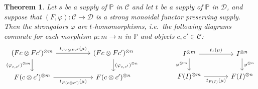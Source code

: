 \documentclass[11pt, oneside, article]{memoir}
\theoremstyle{plain}
\newtheorem{theorem}{Theorem}[chapter]
\theoremstyle{definition}
\theoremstyle{remark}
\newcommand{\cat}[1]{\mathcal{#1}}%
\newcommand{\tpow}[1]{^{\otimes #1}}
\newcommand{\pp}{\mathbb{P}}
\begin{document}
\begin{theorem}\label{thm.pres_supp_strongators_homo}
Let $s$ be a supply of $\pp$ in $\cat{C}$ and let $t$ be a supply of $\pp$ in $\cat{D}$, and suppose that $(F,\varphi)\colon\cat{C}\to\cat{D}$ is a strong monoidal functor preserving supply. Then the strongators $\varphi$ are $t$-homomorphisms, i.e.\ the following diagrams commute for each morphism $\mu\colon m\to n$ in $\pp$ and objects $c,c'\in\cat{C}$:
\[
\begin{tikzcd}[column sep=50pt]
	(Fc\otimes Fc')\tpow{m}
		\ar[r, "t_{Fc\otimes Fc'}(\mu)"]\ar[d, "(\varphi_{c,c'})\tpow{m}"']&
 	(Fc\otimes Fc')\tpow{n}\ar[d, "(\varphi_{c,c'})\tpow{n}"]\\
  F(c\otimes c')\tpow{m}\ar[r, "t_{F(c\otimes c')}(\mu)"']&
  F(c\otimes c')\tpow{n}
\end{tikzcd}
\hspace{.7in}
\begin{tikzcd}[column sep=35pt]
	I\tpow{m}
		\ar[r, "t_I(\mu)"]\ar[d, "\varphi\tpow{m}"']&
 	I\tpow{n}\ar[d, "\varphi\tpow{n}"]\\
  F(I)\tpow{m}\ar[r, "t_{F(I)}(\mu)"']&
  F(I)\tpow{n}
\end{tikzcd}
\]
\end{theorem}
\end{document}
